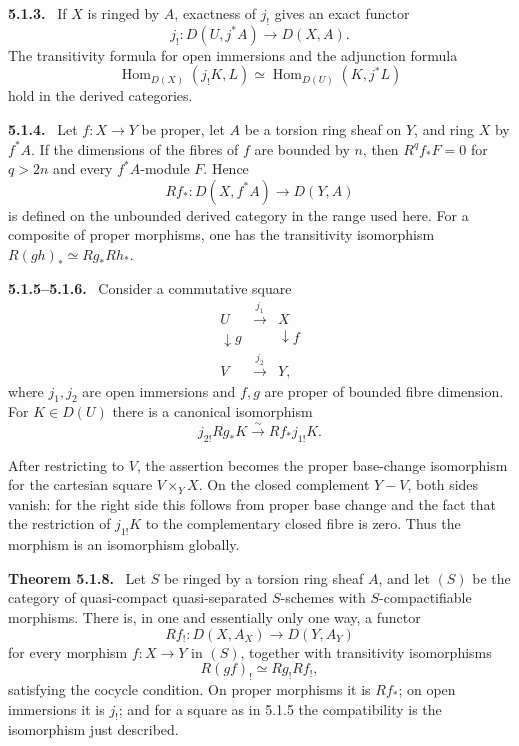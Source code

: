 \documentclass[12pt]{article}
\newcommand{\Hom}{\operatorname{Hom}}
\newenvironment{statement}[1]{\par\medskip\noindent\textbf{#1.}\ }{\par\medskip}
\begin{document}
\begin{statement}{5.1.3}
If \(X\) is ringed by \(A\), exactness of \(j_!\) gives an exact functor
\[
j_!:D(U,j^*A)\to D(X,A).
\]
The transitivity formula for open immersions and the adjunction formula
\[
\Hom_{D(X)}(j_!K,L)\simeq \Hom_{D(U)}(K,j^*L)
\]
hold in the derived categories.
\end{statement}

\begin{statement}{5.1.4}
Let \(f:X\to Y\) be proper, let \(A\) be a torsion ring sheaf on \(Y\), and ring \(X\) by \(f^*A\). If the dimensions of the fibres of \(f\) are bounded by \(n\), then \(R^qf_*F=0\) for \(q>2n\) and every \(f^*A\)-module \(F\). Hence
\[
Rf_*:D(X,f^*A)\to D(Y,A)
\]
is defined on the unbounded derived category in the range used here. For a composite of proper morphisms, one has the transitivity isomorphism \(R(gh)_*\simeq Rg_*Rh_*\).
\end{statement}

\begin{statement}{5.1.5--5.1.6}
Consider a commutative square
\[
\begin{array}{ccc}
U&\xrightarrow{j_1}&X\\
\downarrow g&&\downarrow f\\
V&\xrightarrow{j_2}&Y,
\end{array}
\]
where \(j_1,j_2\) are open immersions and \(f,g\) are proper of bounded fibre dimension. For \(K\in D(U)\) there is a canonical isomorphism
\[
j_{2!}Rg_*K\xrightarrow{\sim}Rf_*j_{1!}K.
\]
\end{statement}

After restricting to \(V\), the assertion becomes the proper base-change isomorphism for the cartesian square \(V\times_YX\). On the closed complement \(Y-V\), both sides vanish: for the right side this follows from proper base change and the fact that the restriction of \(j_{1!}K\) to the complementary closed fibre is zero. Thus the morphism is an isomorphism globally.

\begin{statement}{Theorem 5.1.8}
Let \(S\) be ringed by a torsion ring sheaf \(A\), and let \((S)\) be the category of quasi-compact quasi-separated \(S\)-schemes with \(S\)-compactifiable morphisms. There is, in one and essentially only one way, a functor
\[
Rf_!:D(X,A_X)\to D(Y,A_Y)
\]
for every morphism \(f:X\to Y\) in \((S)\), together with transitivity isomorphisms
\[
R(gf)_!\simeq Rg_!Rf_!,
\]
satisfying the cocycle condition. On proper morphisms it is \(Rf_*\); on open immersions it is \(j_!\); and for a square as in 5.1.5 the compatibility is the isomorphism just described.
\end{statement}
\end{document}
